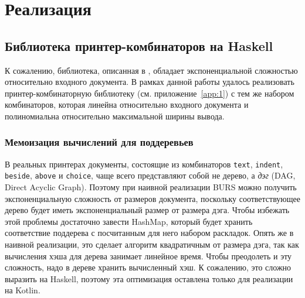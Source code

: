\section{Реализация}

\subsection{Библиотека принтер-комбинаторов на Haskell}
К сожалению, библиотека, описанная в \cite{swierstra}, обладает экспоненциальной
сложностью относительно входного документа. В рамках данной работы удалось реализовать
принтер-комбинаторную библиотеку (см. приложение~\ref{app:1}) с тем же набором комбинаторов,
которая линейна относительно входного документа и полиномиальна
относительно максимальной ширины вывода.




\subsubsection{Мемоизация вычислений для поддеревьев}

В реальных принтерах документы, состоящие из комбинаторов
\lstinline[language=Haskell]{text},
\lstinline[language=Haskell]{indent},
\lstinline[language=Haskell]{beside},
\lstinline[language=Haskell]{above} и \lstinline[language=Haskell]{choice}, чаще всего
представляют собой не дерево, а \textit{дэг} (DAG, Direct Acyclic Graph). Поэтому при наивной
реализации BURS можно получить экспоненциальную сложность от размеров документа,
поскольку соответствующее дерево будет иметь экспоненциальный размер от размера дэга.
Чтобы избежать этой проблемы достаточно завести HashMap, который будет хранить соответствие
поддерева с посчитанным для него набором раскладок. Опять же в наивной реализации,
это сделает алгоритм квадратичным от размера дэга, так как вычисления хэша для дерева занимает
линейное время. Чтобы преодолеть и эту сложность, надо в дереве хранить вычисленный хэш.
К сожалению, это сложно выразить на Haskell, поэтому эта оптимизация оставлена только для реализации
на Kotlin.

